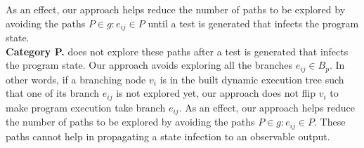 As an effect, our approach helps reduce the number of paths to be explored by avoiding the paths $P \in g : e_{ij} \in P$ until a test is generated that infects the program state.
\\ \textbf{Category P. }
 does not explore these paths after a test is generated that infects the program state.
Our approach avoids exploring all the branches 
$e_{ij}\in B_p$. In other words, if a branching node $v_i$ is in the built dynamic execution tree such that one of its branch $e_{ij}$ is not explored yet, our approach does not flip $v_i$ to make program execution take branch $e_{ij}$.
As an effect, our approach helps reduce the number of paths to be explored by avoiding the paths $P \in g : e_{ij} \in P$.
These paths cannot help in propagating a state infection to an observable output.

